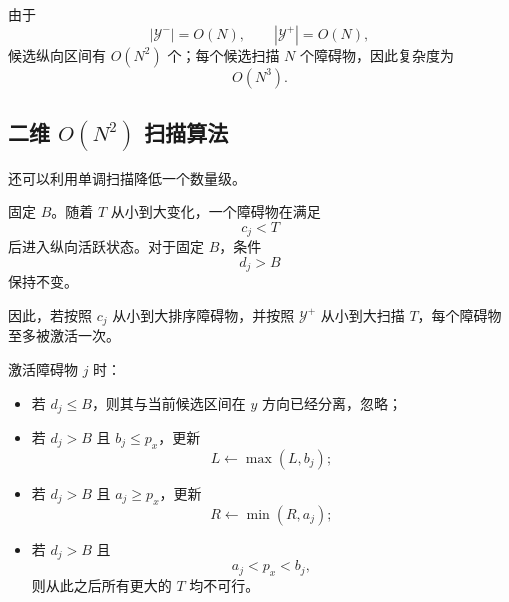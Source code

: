 \documentclass[UTF8,12pt,a4paper]{ctexart}
\begin{document}
由于
\[
|\mathcal Y^-|=O(N),
\qquad
|\mathcal Y^+|=O(N),
\]
候选纵向区间有 $O(N^2)$ 个；每个候选扫描 $N$ 个障碍物，因此复杂度为
\[
O(N^3).
\]

\subsection{二维 \texorpdfstring{$O(N^2)$}{O(N2)} 扫描算法}

还可以利用单调扫描降低一个数量级。

固定 $B$。随着 $T$ 从小到大变化，一个障碍物在满足
\[
c_j<T
\]
后进入纵向活跃状态。对于固定 $B$，条件
\[
d_j>B
\]
保持不变。

因此，若按照 $c_j$ 从小到大排序障碍物，并按照 $\mathcal Y^+$ 从小到大扫描 $T$，每个障碍物至多被激活一次。

激活障碍物 $j$ 时：

\begin{itemize}
    \item 若 $d_j\le B$，则其与当前候选区间在 $y$ 方向已经分离，忽略；
    \item 若 $d_j>B$ 且 $b_j\le p_x$，更新
    \[
    L\leftarrow\max(L,b_j);
    \]
    \item 若 $d_j>B$ 且 $a_j\ge p_x$，更新
    \[
    R\leftarrow\min(R,a_j);
    \]
    \item 若 $d_j>B$ 且
    \[
    a_j<p_x<b_j,
    \]
    则从此之后所有更大的 $T$ 均不可行。
\end{itemize}
\end{document}
